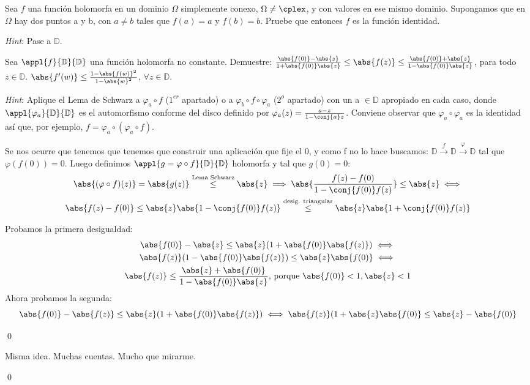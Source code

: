 \begin{problem}
Sea $f$ una función holomorfa en un dominio $\Omega$ simplemente conexo, $\Omega \neq \cplex$, y con valores en ese mismo dominio. Supongamos que en $\Omega$ hay dos puntos a y b, con $a \neq b$ tales que $f(a) = a$ y $f(b) = b$. Pruebe que entonces $f$ es la función identidad.

{\it Hint}: Pase a $\mathbb{D}$.
\solution


\end{problem}

\begin{problem}
Sea $\appl{f}{\mathbb{D}}{\mathbb{D}}$ una función holomorfa no constante. Demuestre:
\ppart $\frac{\abs{f(0)} - \abs{z}}{1 + \abs{f(0)}\abs{z}} \leq \abs{f(z)} \leq \frac{\abs{f(0)} + \abs{z}}{1 - \abs{f(0)}\abs{z}}$, para todo $z \in \mathbb{D}$.
\ppart $\abs{f'(w)} \leq \frac{1 - \abs{f(w)}^2}{1 - \abs{w}^2}$, $\forall z \in \mathbb{D}$.

{\it Hint}: Aplique el Lema de Schwarz a $\varphi_a \circ f$ ($1^{er}$ apartado) o a $\varphi_b \circ f \circ \varphi_a$ ($2^o$ apartado) con un a $\in \mathbb{D}$ apropiado en cada caso, donde $\appl{\varphi_a}{\mathbb{D}}{\mathbb{D}}$ es el automorfismo conforme del disco definido por $\varphi_a(z) = \frac{a - z}{1 - \conj{a} z}$. Conviene observar que $\varphi_a \circ \varphi_a$ es la identidad así que, por ejemplo, $f = \varphi_a \circ (\varphi_a \circ f)$.
\solution

\spart
Se nos ocurre que tenemos que tenemos que construir una aplicación que fije el 0, y como f no lo hace buscamos: $\mathbb{D}\xrightarrow{f}\mathbb{D}\xrightarrow{\varphi}\mathbb{D}$ tal que $\varphi(f(0)) = 0$.
Luego definimos $\appl{g = \varphi \circ f}{\mathbb{D}}{\mathbb{D}}$ holomorfa y tal que $g(0) = 0$:
\begin{gather*}
\abs{(\varphi \circ f)(z)} = \abs{g(z)} \stackrel{\text{Lema Schwarz}}{\leq} \abs{z} \implies \abs{\frac{f(z) - f(0)}{1 - \conj{f(0)} f(z)}} \leq \abs{z} \iff \\
\abs{f(z) - f(0)} \leq \abs{z} \abs{1 - \conj{f(0)} f(z)} \stackrel{\text{desig. triangular}}{\leq} \abs{z} \abs{1 + \conj{f(0)} f(z)}
\end{gather*}

Probamos la primera desigualdad:
\begin{gather*}
\abs{f(0)} - \abs{z} \leq \abs{z}(1 + \abs{f(0)}\abs{f(z)}) \iff\\
\abs{f(z)}(1 - \abs{f(0)}\abs{f(z)}) \leq \abs{z} \abs{f(0)} \iff\\
\abs{f(z)} \leq \frac{\abs{z} + \abs{f(0)}}{1 - \abs{f(0)}\abs{z}} \text{, porque } \abs{f(0)} < 1, \abs{z} < 1
\end{gather*}
Ahora probamos la segunda:
\[ \abs{f(0)} - \abs{f(z)} \leq \abs{z}(1 + \abs{f(0)}\abs{f(z)}) \iff \abs{f(z)} (1 + \abs{z}\abs{f(0)} \leq \abs{z} - \abs{f(0)} \]

$ $\hfill\qed

\spart
Misma idea. Muchas cuentas. Mucho que mirarme.

$ $\hfill\qed
\end{problem}

